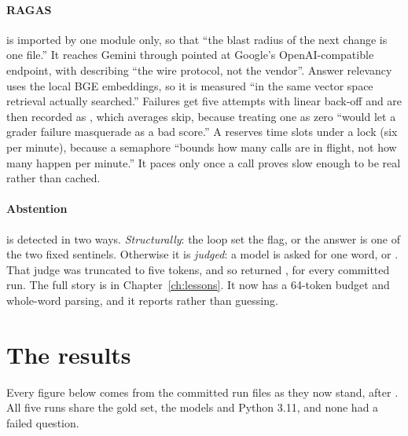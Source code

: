 \paragraph{RAGAS} is imported by one module only, so that ``the blast radius of the next change is one file.'' It reaches Gemini through  pointed at Google's OpenAI-compatible endpoint, with  describing ``the wire protocol, not the vendor''. Answer relevancy uses the local BGE embeddings, so it is measured ``in the same vector space retrieval actually searched.'' Failures get five attempts with linear back-off and are then recorded as , which averages skip, because treating one as zero ``would let a grader failure masquerade as a bad score.'' A  reserves time slots under a lock (six per minute), because a semaphore ``bounds how many calls are in flight, not how many happen per minute.'' It paces only once a call proves slow enough to be real rather than cached.

\paragraph{Abstention} is detected in two ways. \emph{Structurally}: the loop set the flag, or the answer is one of the two fixed sentinels. Otherwise it is \emph{judged}: a model is asked for one word,  or . That judge was truncated to five tokens, and so returned , for every committed run. The full story is in Chapter~\ref{ch:lessons}. It now has a 64-token budget and whole-word parsing, and it reports  rather than guessing.

\section{The results}
\label{sec:results}

Every figure below comes from the committed run files as they now stand, after . All five runs share the gold set, the models and Python 3.11, and none had a failed question.

